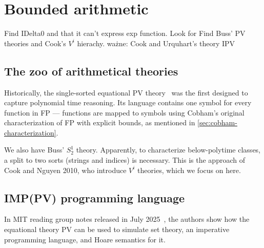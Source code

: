 
\chapter{Bounded arithmetic}
\label{chap:bounded-arithmetic}

 Find IDelta0 and that it can't express exp function. Look for
 Find Buss' PV theories and Cook's $V^i$ hierachy.
 ważne: Cook and Urquhart's theory IPV

\section{The zoo of arithmetical theories}
Historically, the single-sorted equational PV theory~\cite{10.1145/800116.803756} was
the first designed to capture polynomial time reasoning.
Its language contains one symbol for every function in FP --- functions are mapped to symbols
using Cobham's original characterization of FP with explicit bounds, as mentioned in \ref{sec:cobham-characterization}.

We also have Buss' $S^1_2$ theory. Apparently, to characterize below-polytime classes, a split to two sorts (strings and indices)
is necessary. This is the approach of Cook and Nguyen 2010, who introduce $V^i$ theories, which we focus on here.



\section{IMP(PV) programming language}
In MIT reading group notes released in July 2025~\cite{Li2025FeasibleMathematics}, the authors show how the equational theory PV
can be used to simulate set theory, an imperative programming language, and Hoare semantics for it.


